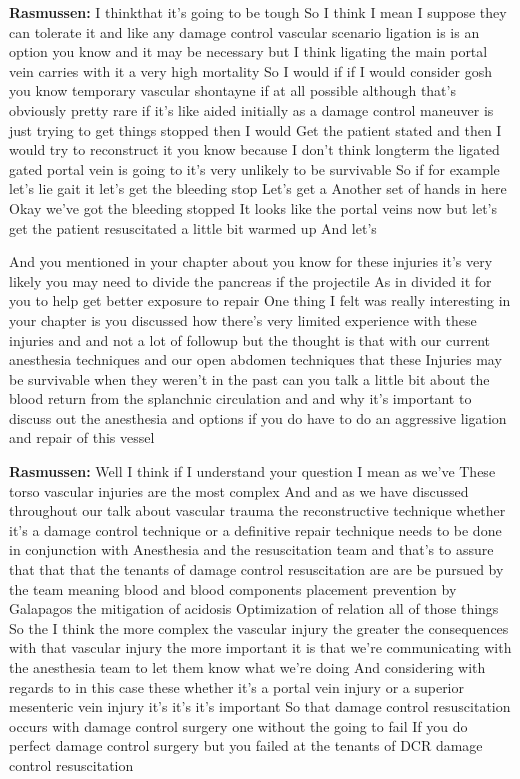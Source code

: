 \documentclass[
]{book}
\begin{document}
\textbf{Rasmussen:} I thinkthat it's going to be tough So I think I mean I suppose they can tolerate it and like any damage control vascular scenario ligation is is an option you know and it may be necessary but I think ligating the main portal vein carries with it a very high mortality So I would if if I would consider gosh you know temporary vascular shontayne if at all possible although that's obviously pretty rare if it's like aided initially as a damage control maneuver is just trying to get things stopped then I would Get the patient stated and then I would try to reconstruct it you know because I don't think longterm the ligated gated portal vein is going to it's very unlikely to be survivable So if for example let's lie gait it let's get the bleeding stop Let's get a Another set of hands in here Okay we've got the bleeding stopped It looks like the portal veins now but let's get the patient resuscitated a little bit warmed up And let's

And you mentioned in your chapter about you know for these injuries it's very likely you may need to divide the pancreas if the projectile As in divided it for you to help get better exposure to repair One thing I felt was really interesting in your chapter is you discussed how there's very limited experience with these injuries and and not a lot of followup but the thought is that with our current anesthesia techniques and our open abdomen techniques that these Injuries may be survivable when they weren't in the past can you talk a little bit about the blood return from the splanchnic circulation and and why it's important to discuss out the anesthesia and options if you do have to do an aggressive ligation and repair of this vessel

\textbf{Rasmussen:} Well I think if I understand your question I mean as we've These torso vascular injuries are the most complex And and as we have discussed throughout our talk about vascular trauma the reconstructive technique whether it's a damage control technique or a definitive repair technique needs to be done in conjunction with Anesthesia and the resuscitation team and that's to assure that that that the tenants of damage control resuscitation are are be pursued by the team meaning blood and blood components placement prevention by Galapagos the mitigation of acidosis Optimization of relation all of those things So the I think the more complex the vascular injury the greater the consequences with that vascular injury the more important it is that we're communicating with the anesthesia team to let them know what we're doing And considering with regards to in this case these whether it's a portal vein injury or a superior mesenteric vein injury it's it's it's important So that damage control resuscitation occurs with damage control surgery one without the going to fail If you do perfect damage control surgery but you failed at the tenants of DCR damage control resuscitation
\end{document}
